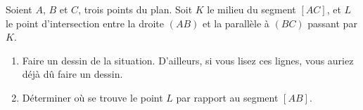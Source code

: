 
\begin{exercice}\label{exoSeconde-0082}

    Soient \( A\), \( B\) et \( C\), trois points du plan. Soit \( K\) le milieu du segment \( [AC]\), et \( L\) le point d'intersection entre la droite \( (AB)\) et la parallèle à \( (BC)\) passant par \( K\).
    \begin{enumerate}
        \item
            Faire un dessin de la situation. D'ailleurs, si vous lisez ces lignes, vous auriez déjà dû faire un dessin.
        \item
            Déterminer où se trouve le point \( L\) par rapport au segment \( [AB]\).
    \end{enumerate}

\end{exercice}
